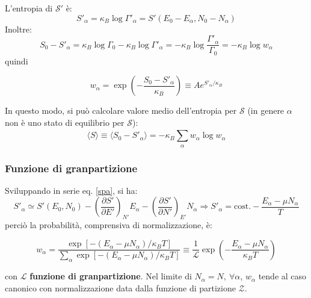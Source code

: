 \documentclass[10pt, a4paper]{scrartcl}
\numberwithin{equation}{subsection}
\theoremstyle{style1}
\newenvironment{boxenv}[1][]{
    \begin{eqbox}[#1]
    }{
   \end{eqbox}
}
\begin{document}
L'entropia di $\mathscr{S}'$ \`e:
\begin{equation}\label{spa}
	S'_\alpha = \kappa _B \log \Gamma'_\alpha  = S'(E_0 - E_\alpha , N_0 - N_\alpha )
\end{equation}
Inoltre:
\begin{equation}
	S_0 - S'_\alpha  = \kappa _B \log \Gamma_0 - \kappa _B \log \Gamma'_\alpha = - \kappa _B \log \frac{\Gamma'_\alpha }{\Gamma_0} = -\kappa _B \log w_\alpha 
\end{equation}
quindi
\begin{boxenv}[]
\begin{equation}
	w_\alpha  = \exp \left(-\frac{S_0-S'_\alpha }{\kappa _B}\right) \equiv A e^{S'_\alpha  / \kappa _B} 
\end{equation}
\end{boxenv}
\noindent In questo modo, si pu\`o calcolare valore medio dell'entropia per $\mathscr{S}$ (in genere $\alpha $ non \`e uno stato di equilibrio per $\mathscr{S}$):
\begin{equation}
	\langle S  \rangle \equiv \langle S_0 - S'_\alpha  \rangle = - \kappa _B \sum_{\alpha }^{} w_\alpha  \log w_\alpha 
\end{equation}
\subsubsection{Funzione di granpartizione}
Sviluppando in serie eq. \ref{spa}, si ha:
\begin{equation}
	S'_\alpha  \simeq S'(E_0,N_0) - \left(\frac{\partial S'}{\partial E'} \right) _{N'} E_\alpha - \left(\frac{\partial S'}{\partial N'} \right) _{E'} N_\alpha \Rightarrow S'_\alpha  = \text{cost.} - \frac{E_\alpha - \mu  N_\alpha }{T }
\end{equation}
perci\`o la probabilit\`a, comprensiva di normalizzazione, \`e:
\begin{boxenv}[]
\begin{equation}
	w_\alpha = \frac{\exp \left[ -(E_\alpha  - \mu  N_\alpha ) / \kappa _B T \right] }{\sum_{\alpha }^{} \exp \left[ - (E_\alpha  - \mu  N_\alpha ) / \kappa _B T \right] } \equiv \frac{1}{\mathscr{L}} \exp \left(- \frac{E_\alpha - \mu  N_\alpha }{\kappa _B T}\right) 
\end{equation}
\end{boxenv}
\noindent con $\mathscr{L}$ \textbf{funzione di granpartizione}. Nel limite di $N_\alpha  = N, \ \forall \alpha $, $w_\alpha $ tende al caso canonico con normalizzazione data dalla funzione di partizione $\mathscr{Z}$.
\end{document}
